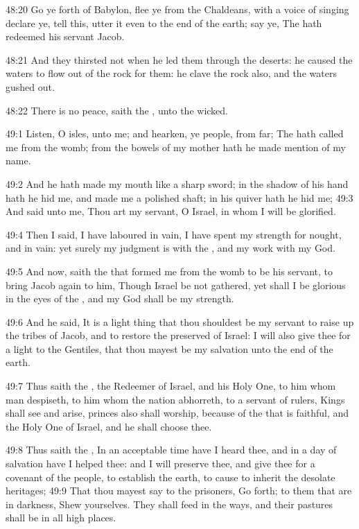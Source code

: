 48:20 Go ye forth of Babylon, flee ye from the Chaldeans, with a voice
of singing declare ye, tell this, utter it even to the end of the
earth; say ye, The \LORD hath redeemed his servant Jacob.

48:21 And they thirsted not when he led them through the deserts: he
caused the waters to flow out of the rock for them: he clave the rock
also, and the waters gushed out.

48:22 There is no peace, saith the \LORD, unto the wicked.

49:1 Listen, O isles, unto me; and hearken, ye people, from far; The
\LORD hath called me from the womb; from the bowels of my mother hath
he made mention of my name.

49:2 And he hath made my mouth like a sharp sword; in the shadow of
his hand hath he hid me, and made me a polished shaft; in his quiver
hath he hid me; 49:3 And said unto me, Thou art my servant, O Israel,
in whom I will be glorified.

49:4 Then I said, I have laboured in vain, I have spent my strength
for nought, and in vain: yet surely my judgment is with the \LORD, and
my work with my God.

49:5 And now, saith the \LORD that formed me from the womb to be his
servant, to bring Jacob again to him, Though Israel be not gathered,
yet shall I be glorious in the eyes of the \LORD, and my God shall be
my strength.

49:6 And he said, It is a light thing that thou shouldest be my
servant to raise up the tribes of Jacob, and to restore the preserved
of Israel: I will also give thee for a light to the Gentiles, that
thou mayest be my salvation unto the end of the earth.

49:7 Thus saith the \LORD, the Redeemer of Israel, and his Holy One, to
him whom man despiseth, to him whom the nation abhorreth, to a servant
of rulers, Kings shall see and arise, princes also shall worship,
because of the \LORD that is faithful, and the Holy One of Israel, and
he shall choose thee.

49:8 Thus saith the \LORD, In an acceptable time have I heard thee, and
in a day of salvation have I helped thee: and I will preserve thee,
and give thee for a covenant of the people, to establish the earth, to
cause to inherit the desolate heritages; 49:9 That thou mayest say to
the prisoners, Go forth; to them that are in darkness, Shew
yourselves. They shall feed in the ways, and their pastures shall be
in all high places.

